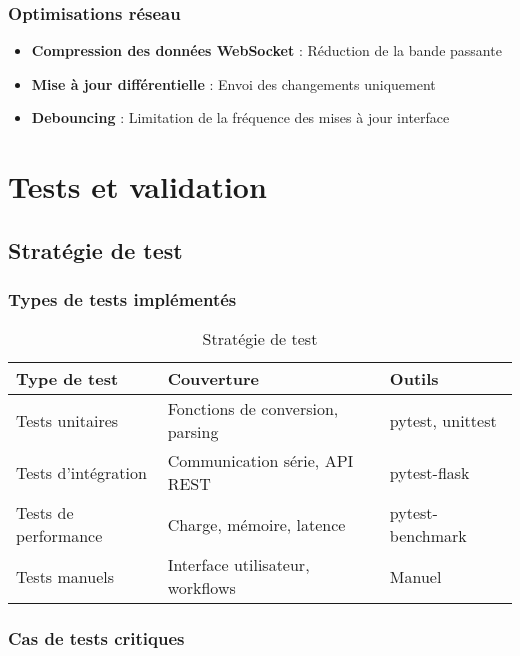 \documentclass[12pt,a4paper]{article}
\begin{document}
\subsubsection{Optimisations réseau}

\begin{itemize}
    \item \textbf{Compression des données WebSocket} : Réduction de la bande passante
    \item \textbf{Mise à jour différentielle} : Envoi des changements uniquement
    \item \textbf{Debouncing} : Limitation de la fréquence des mises à jour interface
\end{itemize}

\section{Tests et validation}

\subsection{Stratégie de test}

\subsubsection{Types de tests implémentés}

\begin{table}[H]
\centering
\begin{tabular}{|l|l|p{7cm}|}
\hline
\textbf{Type de test} & \textbf{Couverture} & \textbf{Outils} \\
\hline
Tests unitaires & Fonctions de conversion, parsing & pytest, unittest \\
\hline
Tests d'intégration & Communication série, API REST & pytest-flask \\
\hline
Tests de performance & Charge, mémoire, latence & pytest-benchmark \\
\hline
Tests manuels & Interface utilisateur, workflows & Manuel \\
\hline
\end{tabular}
\caption{Stratégie de test}
\label{tab:test_strategy}
\end{table}

\subsubsection{Cas de tests critiques}
\end{document}
